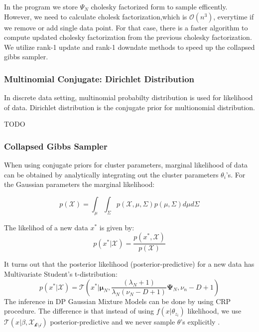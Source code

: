 \documentclass[a4paper]{article}
\begin{document}
In the program we store \(\Psi_N\) cholesky factorized form to sample
efficently. However, we need to calculate cholesk factorization,which is
$\mathcal{O}(n^3)$, everytime if we remove or add single data point.
For that case, there is a faster algorithm to compute updated cholesky
factorization from the previous cholesky factorization\cite{Seeger:161468}. We utilize rank-1
update and rank-1 downdate methods to speed up the collapsed gibbs
sampler.


\subsubsection{Multinomial Conjugate: Dirichlet Distribution}

In discrete data setting, multinomial probabilty distribution is used
for likelihood of data. Dirichlet distribution is the conjugate prior
for multionomial distribution.

TODO


\subsubsection{Collapsed Gibbs Sampler}

When using conjugate priors for cluster parameters, marginal likelihood
of data can be obtained by analytically integrating out the cluster
parameters \(\theta_i\)'s. For the Gaussian parameters the marginal
likelihood:

\begin{equation*}
p(\mathcal{X}) = \int_\mu\int_\Sigma p(\mathcal{X},\mu,\Sigma)p(\mu,\Sigma)d\mu d\Sigma
\end{equation*}

The likelihod of a new data \(x^*\) is given by:
\begin{equation*}
p(x^* | \mathcal{X}) = \frac{p(x^*,\mathcal{X})}{p(\mathcal{X})}
\end{equation*}

It turns out that the posterior likelihood (posterior-predictive) for a
new data has Multivariate Student's t-distribution\cite{kamper2013gibbs}:
\begin{equation*}
    p(x^*|\mathcal{X}) = \mathcal{T}(x^*|\boldsymbol \mu_N,\frac{(\lambda_N+1)}{\lambda_N(\nu_N-D+1)} \boldsymbol\Psi_N,\nu_n-D+1)
\end{equation*}
The inference in DP Gaussian Mixture Models can be done by using CRP
procedure. The difference is that instead of using \(f(x|\theta_{z_i})\)
likelihood, we use \(\mathcal{T}(x|\beta,\mathcal{X_{k \setminus i}})\)
posterior-predictive and we never sample \(\theta\)'s
explicitly \cite{kamper2013gibbs}.
\end{document}
